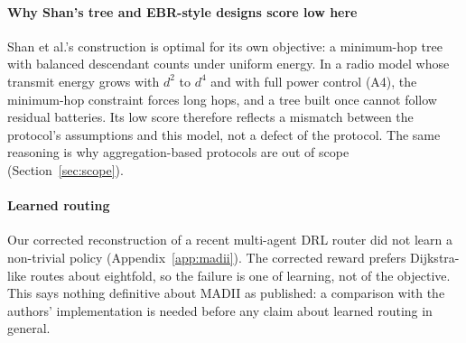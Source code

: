 \paragraph{Why Shan's tree and EBR-style designs score low here} Shan et al.'s construction is optimal for its own objective: a minimum-hop tree with balanced descendant counts under uniform energy. In a radio model whose transmit energy grows with $d^2$ to $d^4$ and with full power control (A4), the minimum-hop constraint forces long hops, and a tree built once cannot follow residual batteries. Its low score therefore reflects a mismatch between the protocol's assumptions and this model, not a defect of the protocol. The same reasoning is why aggregation-based protocols are out of scope (Section~\ref{sec:scope}).

\paragraph{Learned routing} Our corrected reconstruction of a recent multi-agent DRL router did not learn a non-trivial policy (Appendix~\ref{app:madii}). The corrected reward prefers Dijkstra-like routes about eightfold, so the failure is one of learning, not of the objective. This says nothing definitive about MADII as published: a comparison with the authors' implementation is needed before any claim about learned routing in general.


